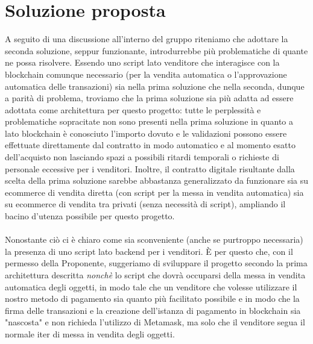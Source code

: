 \documentclass[a4paper, 12pt]{article}
\begin{document}
\section{Soluzione proposta}
A seguito di una discussione all'interno del gruppo riteniamo che adottare la seconda soluzione, seppur funzionante, introdurrebbe più problematiche di quante ne possa risolvere.
Essendo uno script lato venditore che interagisce con la blockchain comunque necessario (per la vendita automatica o l'approvazione automatica delle transazioni) sia nella prima soluzione che nella seconda, dunque a parità di problema, troviamo che la prima soluzione sia più adatta ad essere adottata come architettura per questo progetto: tutte le perplessità e problematiche sopracitate non sono presenti nella prima soluzione in quanto a lato blockchain è conosciuto l'importo dovuto e le validazioni possono essere effettuate direttamente dal contratto in modo automatico e al momento esatto dell'acquisto non lasciando spazi a possibili ritardi temporali o richieste di personale eccessive per i venditori.
Inoltre, il contratto digitale risultante dalla scelta della prima soluzione sarebbe abbastanza generalizzato da funzionare sia su ecommerce di vendita diretta (con script per la messa in vendita automatica) sia su ecommerce di vendita tra privati (senza necessità di script), ampliando il bacino d'utenza possibile per questo progetto.\\\\
Nonostante ciò ci è chiaro come sia sconveniente (anche se purtroppo necessaria) la presenza di uno script lato backend per i venditori.
È per questo che, con il permesso della Proponente, suggeriamo di sviluppare il progetto secondo la prima architettura descritta \textit{nonchè} lo script che dovrà occuparsi della messa in vendita automatica degli oggetti, in modo tale che un venditore che volesse utilizzare il nostro metodo di pagamento sia quanto più facilitato possibile e in modo che la firma delle transazioni e la creazione dell'istanza di pagamento in blockchain sia "nascosta" e non richieda l'utilizzo di Metamask, ma solo che il venditore segua il normale iter di messa in vendita degli oggetti.
\end{document}
